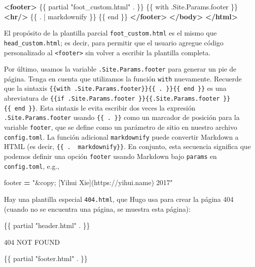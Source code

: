 \documentclass[12pt,]{krantz}
\makeatletter
\newenvironment{Shaded}{\begin{snugshade}}{\end{snugshade}}
\newcommand{\KeywordTok}[1]{\textcolor[rgb]{0.13,0.29,0.53}{\textbf{#1}}}
\newcommand{\NormalTok}[1]{#1}
\newcommand{\OperatorTok}[1]{\textcolor[rgb]{0.81,0.36,0.00}{\textbf{#1}}}
\newcommand{\StringTok}[1]{\textcolor[rgb]{0.31,0.60,0.02}{#1}}
\newenvironment{kframe}{%
\medskip{}
\setlength{\fboxsep}{.8em}
 \def\at@end@of@kframe{}%
 \ifinner\ifhmode%
  \def\at@end@of@kframe{\end{minipage}}%
  \begin{minipage}{\columnwidth}%
 \fi\fi%
 \def\FrameCommand##1{\hskip\@totalleftmargin \hskip-\fboxsep
 \colorbox{shadecolor}{##1}\hskip-\fboxsep
     \hskip-\linewidth \hskip-\@totalleftmargin \hskip\columnwidth}%
 \MakeFramed {\advance\hsize-\width
   \@totalleftmargin\z@ \linewidth\hsize
   \@setminipage}}%
 {\par\unskip\endMakeFramed%
 \at@end@of@kframe}
\renewenvironment{Shaded}{\begin{kframe}}{\end{kframe}}
\theoremstyle{definition}
\theoremstyle{definition}
\theoremstyle{definition}
\theoremstyle{remark}
\makeatother
\begin{document}
\begin{itemize}
\begin{itemize}
\begin{Shaded}
\begin{Highlighting}[]
  \KeywordTok{<footer>}
\NormalTok{  \{\{ partial "foot_custom.html" . \}\}}
\NormalTok{  \{\{ with .Site.Params.footer \}\}}
  \KeywordTok{<hr/>}
\NormalTok{  \{\{ . | markdownify \}\}}
\NormalTok{  \{\{ end \}\}}
  \KeywordTok{</footer>}
  \KeywordTok{</body>}
\KeywordTok{</html>}
\end{Highlighting}
\end{Shaded}

    El propósito de la plantilla parcial \texttt{foot\_custom.html} es
    el mismo que \texttt{head\_custom.html}; es decir, para permitir que
    el usuario agregue código personalizado al
    \texttt{\textless{}footer\textgreater{}} sin volver a escribir la
    plantilla completa.

    Por último, usamos la variable \texttt{.Site.Params.footer} para
    generar un pie de página. Tenga en cuenta que utilizamos la función
    \texttt{with} nuevamente. Recuerde que la sintaxis
    \texttt{\{\{with\ .Site.Params.footer\}\}\{\{\ .\ \}\}\{\{\ end\ \}\}}
    es una abreviatura de
    \texttt{\{\{if\ .Site.Params.footer\ \}\}\{\{.Site.Params.footer\ \}\}\{\{\ end\ \}\}}.
    Esta sintaxis le evita escribir dos veces la expresión
    \texttt{.Site.Params.footer} usando \texttt{\{\{\ .\ \}\}} como un
    marcador de posición para la variable \texttt{footer}, que se define
    como un parámetro de sitio en nuestro archivo \texttt{config.toml}.
    La función adicional \texttt{markdownify} puede convertir Markdown a
    HTML (es decir, \texttt{\{\{\ .\ \textbar{}\ markdownify\}\}}. En
    conjunto, esta secuencia significa que podemos definir una opción
    \texttt{footer} usando Markdown bajo \texttt{params} en
    \texttt{config.toml}, e.g.,

\begin{Shaded}
\begin{Highlighting}[]
\NormalTok{[params]}
\NormalTok{    footer }\OperatorTok{=} \StringTok{"&copy; [Yihui Xie](https://yihui.name) 2017"}
\end{Highlighting}
\end{Shaded}
  \end{itemize}
\end{itemize}

Hay una plantilla especial \texttt{404.html}, que Hugo usa para crear la
página 404 (cuando no se encuentra una página, se
muestra esta página):

\begin{Shaded}
\begin{Highlighting}[]
\NormalTok{\{\{ partial "header.html" . \}\}}

\NormalTok{404 NOT FOUND}

\NormalTok{\{\{ partial "footer.html" . \}\}}
\end{Highlighting}
\end{Shaded}
\end{document}
